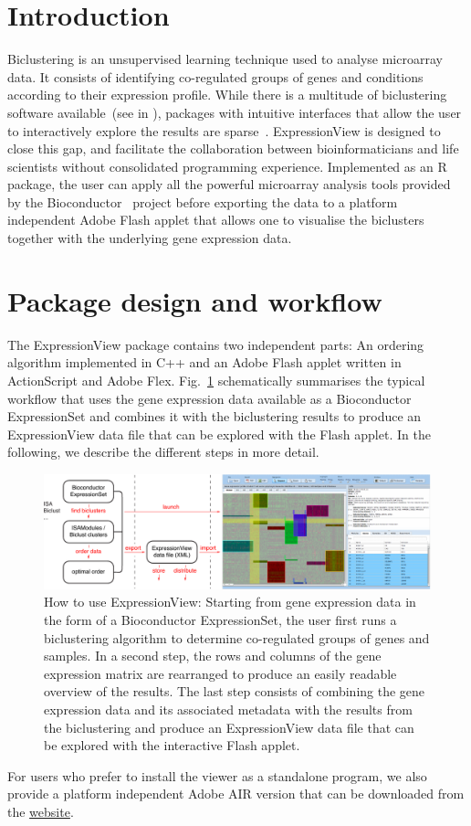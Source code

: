 \documentclass[round]{bioinfo}
\begin{document}
\section{Introduction}
Biclustering is an unsupervised learning technique used to analyse
microarray data. It consists of identifying co-regulated groups of
genes and conditions according to their expression profile. While
there is a multitude of biclustering software available~(see in
\cite{madeira04}), packages with intuitive interfaces that allow the
user to interactively explore the results are
sparse~\citep{santamaria08}. ExpressionView is designed to close this
gap, and facilitate the collaboration between bioinformaticians and
life scientists without consolidated programming
experience. Implemented as an R package, the user can apply all the
powerful microarray analysis tools provided by the
Bioconductor~\citep{gentleman04} project before exporting the data to
a platform independent Adobe Flash applet that allows one to visualise
the biclusters together with the underlying gene expression data. 

\section{Package design and workflow}
The ExpressionView package contains two independent parts: An ordering
algorithm implemented in C++ and an Adobe Flash applet written in
ActionScript and Adobe Flex. Fig.~\ref{fig:workflow} schematically
summarises the typical workflow that uses the gene expression data
available as a Bioconductor ExpressionSet and combines it with the
biclustering results to produce an ExpressionView data file that can
be explored with the Flash applet. In the following, we describe the
different steps in more detail. 
\begin{figure}[!tpb]
\centerline{\includegraphics[width=0.9\linewidth]{fig1-crop}}
\caption{How to use ExpressionView: Starting from gene expression data
  in the form of a Bioconductor ExpressionSet, the user first runs a
  biclustering algorithm to determine co-regulated groups of genes and
  samples. In a second step, the rows and columns of the gene
  expression matrix are rearranged to produce an easily readable
  overview of the results. The last step consists of combining the
  gene expression data and its associated metadata with the results
  from the biclustering and produce an ExpressionView data file that
  can be explored with the interactive Flash
  applet.}\label{fig:workflow} 
\end{figure}
For users who prefer to install the viewer as a standalone program, we
also provide a platform independent Adobe AIR version that can be
downloaded from the
\href{http://www.unil.ch/cbg/ExpressionView}{website}. 
\end{document}
